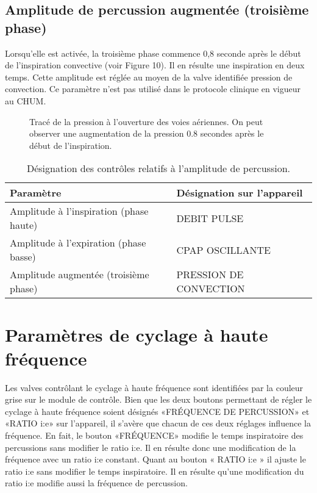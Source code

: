 \subsection{Amplitude de percussion augmentée (troisième phase)}

Lorsqu’elle est activée, la troisième phase commence 0,8 seconde après le début
de l’inspiration convective (voir Figure 10). Il en résulte une inspiration en
deux temps. Cette amplitude est réglée au moyen de la valve identifiée pression
de convection. Ce paramètre n’est pas utilisé dans le protocole clinique en
vigueur au CHUM.

\begin{figure}
\caption{Tracé de la pression à l'ouverture des voies aériennes. On peut
observer une augmentation de la pression 0.8 secondes après le début de
l’inspiration.}
\end{figure}

\begin{table}
	\begin{tabular}{l l}
		\hline
		Paramètre & Désignation sur l’appareil\\
		\hline
		Amplitude à l’inspiration (phase haute) & DEBIT PULSE\\
		Amplitude à l’expiration (phase basse) & CPAP OSCILLANTE\\
		Amplitude augmentée (troisième phase) & PRESSION DE CONVECTION\\
\hline
	\end{tabular}
	\caption{Désignation des contrôles relatifs à l'amplitude de percussion.}
\end{table}

\section{Paramètres de cyclage à haute fréquence}

Les valves contrôlant le cyclage à haute fréquence sont identifiées par la
couleur grise sur le module de contrôle.  Bien que les deux boutons permettant
de régler le cyclage à haute fréquence soient désignés «FRÉQUENCE DE
PERCUSSION» et «RATIO i:e» sur l’appareil, il s’avère que chacun de ces deux
réglages influence la fréquence.  En fait, le bouton «FRÉQUENCE» modifie le
temps inspiratoire des percussions sans modifier le ratio i:e. Il en résulte
donc une modification de la fréquence avec un ratio i:e constant.  Quant au
bouton « RATIO i:e » il ajuste le ratio i:e sans modifier le temps
inspiratoire. Il en résulte qu’une modification du ratio i:e modifie aussi la
fréquence de percussion.


